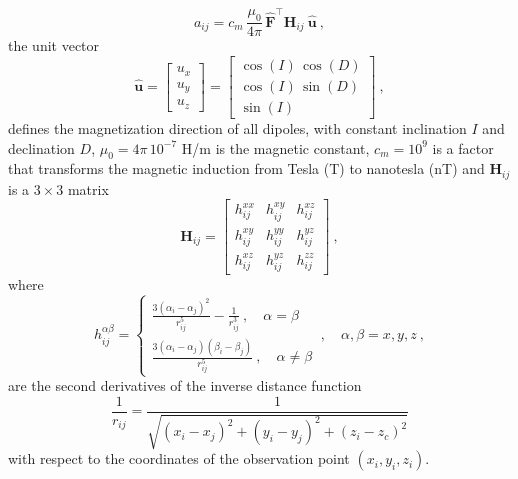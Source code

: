 \begin{equation}
a_{ij}
= c_{m} \, \frac{\mu_{0}}{4\pi} \, \hat{\mathbf{F}}^{\top} \mathbf{H}_{ij} \: \hat{\mathbf{u}} \: ,
\label{eq:aij_mag}
\end{equation}
the unit vector
\begin{equation}
\hat{\mathbf{u}} = \begin{bmatrix}
u_x \\
u_y \\
u_z
\end{bmatrix} =
\begin{bmatrix}
\cos(I) \, \cos(D) \\
\cos(I) \, \sin(D) \\
\sin(I)
\end{bmatrix} \: ,
\label{eq:u_hat}
\end{equation}
defines the magnetization direction of all dipoles, with constant inclination $I$ and declination $D$,
$\mu_{0} = 4\pi \, 10^{-7}$ H/m is the magnetic constant, $c_{m} = 10^{9}$ is a factor that transforms
the magnetic induction from Tesla (T) to nanotesla (nT) and $\mathbf{H}_{ij}$ is a $3 \times 3$ matrix 
\begin{equation}
\mathbf{H}_{ij} = \begin{bmatrix}
h^{xx}_{ij} & h^{xy}_{ij} & h^{xz}_{ij} \\
h^{xy}_{ij} & h^{yy}_{ij} & h^{yz}_{ij} \\
h^{xz}_{ij} & h^{yz}_{ij} & h^{zz}_{ij}
\end{bmatrix} \: ,
\label{eq:Hij}
\end{equation}
where 
\begin{equation}
h^{\alpha\beta}_{ij} = 
\begin{cases}
\frac{3 \left( \alpha_{i} - \alpha_{j} \right)^{2}}{r_{ij}^{5}} - \frac{1}{r_{ij}^{3}} \: , \quad \alpha = \beta \\
\frac{3 \left( \alpha_{i} - \alpha_{j} \right) \left( \beta_{i} - \beta_{j} \right)}{r_{ij}^{5}} \: , \quad \alpha \ne \beta
\end{cases} \: , \quad \alpha, \beta = x, y, z \: ,
\label{eq:hij_alpha_beta}
\end{equation}
are the second derivatives of the inverse distance function
\begin{equation}
\frac{1}{r_{ij}} = 
\frac{1}{\sqrt{\left(x_{i} - x_{j} \right)^{2} + 
\left(y_{i} - y_{j} \right)^{2} + \left(z_{i} - z_{c} \right)^{2}}}
\label{eq:1_rij}
\end{equation}
with respect to the coordinates of the observation point $(x_{i}, y_{i}, z_{i})$.

